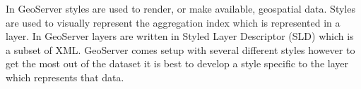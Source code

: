 %
%

In GeoServer styles are used to render, or make available, geospatial data. Styles are used to visually represent the aggregation index which is represented in a layer. In GeoServer layers are written in Styled Layer Descriptor (SLD) which is a subset of XML. GeoServer comes setup with several different styles however to get the most out of the dataset it is best to develop a style specific to the layer which represents that data.

